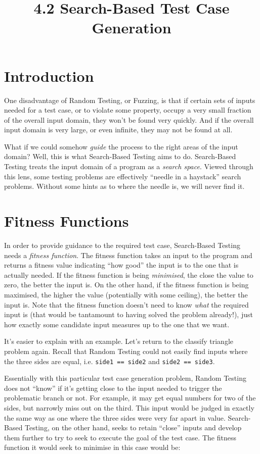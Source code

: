 



\title{4.2 Search-Based Test Case Generation}

\section{Introduction}

One disadvantage of Random Testing, or Fuzzing, is that if certain sets of
inputs needed for a test case, or to violate some property, occupy a very small
fraction of the overall input domain, they won't be found very quickly. And if
the overall input domain is very large, or even infinite, they may not be found
at all.

What if we could somehow {\it guide} the process to the right areas of the input
domain? Well, this is what Search-Based Testing aims to do. Search-Based Testing
treats the input domain of a program as a {\it search space}. Viewed through
this lens, some testing problems are effectively ``needle in a haystack'' search
problems. Without some hints as to where the needle is, we will never find it.

\section{Fitness Functions}
In order to provide guidance to the required test case, Search-Based Testing
needs a {\it fitness function}. The fitness function takes an input to the
program and returns a {fitness value} indicating ``how good'' the input is to
the one that is actually needed. If the fitness function is being {\it
minimised}, the close the value to zero, the better the input is. On the other
hand, if the fitness function is being maximised, the higher the value
(potentially with some ceiling), the better the input is.
%
Note that the fitness function doesn't need to know {\it what} the required
input is (that would be tantamount to having solved the problem already!), just
how exactly some candidate input measures up to the one that we want.

It's easier to explain with an example. Let's return to the classify triangle
problem again. Recall that Random Testing could not easily find inputs where the
three sides are equal, i.e. {\tt side1 == side2} and {\tt side2 == side3}.

Essentially with this particular test case generation problem, Random Testing
does not ``know'' if it's getting close to the input needed to trigger the
problematic branch or not. For example, it may get equal numbers for two of the
sides, but narrowly miss out on the third. This input would be judged in exactly
the same way as one where the three sides were very far apart in value.
Search-Based Testing, on the other hand, seeks to retain ``close'' inputs and
develop them further to try to seek to execute the goal of the test case. The
fitness function it would seek to minimise in this case would be:

